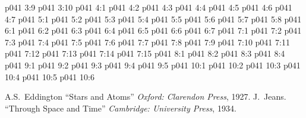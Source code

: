 \vs p041 3:9 
\vs p041 3:10 
\vs p041 4:1 
\vs p041 4:2 \pc 
\vs p041 4:3 \pc 
\vs p041 4:4 
\vs p041 4:5 
\vs p041 4:6 
\vs p041 4:7 
\vs p041 5:1 
\vs p041 5:2 
\vs p041 5:3 
\vs p041 5:4 
\vs p041 5:5 
\vs p041 5:6 \pc 
\vs p041 5:7 \pc 
\vs p041 5:8 
\vs p041 6:1 
\vs p041 6:2 
\vs p041 6:3 \pc 
\vs p041 6:4 
\vs p041 6:5 
\vs p041 6:6 \pc 
\vs p041 6:7 \pc 
{}
\vs p041 7:1 
\vs p041 7:2 
\vs p041 7:3 \pc 
\vs p041 7:4 
\vs p041 7:5 
\vs p041 7:6 
\vs p041 7:7 
\vs p041 7:8 
\vs p041 7:9 
\vs p041 7:10 
\vs p041 7:11 \pc 
\vs p041 7:12 \pc 
\vs p041 7:13 
\vs p041 7:14 \pc 
\vs p041 7:15 
\vs p041 8:1 
\vs p041 8:2 \pc 
\vs p041 8:3 \pc 
\vs p041 8:4 
\vs p041 9:1 
\vs p041 9:2 \pc 
\vs p041 9:3 \pc 
\vs p041 9:4 
\vs p041 9:5 
\vs p041 10:1 
\vs p041 10:2 
\vs p041 10:3 \pc 
\vs p041 10:4 
\vs p041 10:5 \pc 
\vsetoff
\vs p041 10:6 
\quizlink
\begin{thebibliography}{100}
A.S.~Eddington
{``Stars and Atoms''}
{\em Oxford: Clarendon Press}, 1927.
J.~Jeans.
{``Through Space and Time''}
{\em Cambridge: University Press}, 1934.
\end{thebibliography}
